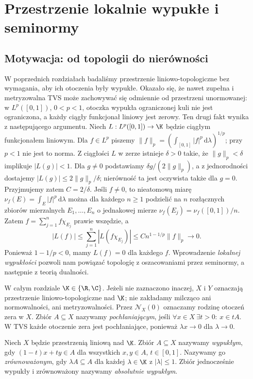 \setcounter{section}{4}
\section{Przestrzenie lokalnie wypukłe i seminormy}\label{sec:lokalnie-wypukle}

\providecommand{\atlasref}[2]{#2}


\subsection{Motywacja: od topologii do nierówności}

W poprzednich rozdziałach badaliśmy przestrzenie liniowo-topologiczne
bez wymagania, aby ich otoczenia były wypukłe. Okazało się, że nawet
zupełna i metryzowalna TVS może zachowywać się odmiennie od przestrzeni
unormowanej: w $L^p([0,1])$, $0<p<1$, otoczka wypukła ograniczonej
kuli nie jest ograniczona, a każdy ciągły funkcjonał liniowy jest zerowy.
Ten drugi fakt wynika z następującego argumentu. Niech
$L:L^p([0,1])\to\K$ będzie ciągłym funkcjonałem liniowym.
Dla $f\in L^p$ piszemy
$\|f\|_p=(\int_{[0,1]}|f|^p\,\mathrm d\lambda)^{1/p}$;
przy $p<1$ nie jest to norma. Z ciągłości $L$ w zerze istnieje $\delta>0$ takie, że
$\|g\|_p<\delta$ implikuje $|L(g)|<1$.
Dla $g\ne0$ podstawiamy $\delta g/(2\|g\|_p)$,
a z jednorodności dostajemy
$|L(g)|\le 2\|g\|_p/\delta$; nierówność ta
jest oczywista także dla $g=0$.
Przyjmujemy zatem $C=2/\delta$.
Jeśli $f\ne0$, to nieatomową miarę
$\nu_f(E)=\int_E|f|^p\,\mathrm d\lambda$ można dla
każdego $n\ge1$ podzielić na $n$ rozłącznych
zbiorów mierzalnych $E_1,\ldots,E_n$ o jednakowej
mierze $\nu_f(E_j)=\nu_f([0,1])/n$. Zatem
$f=\sum_{j=1}^n f\chi_{E_j}$ prawie wszędzie, a
\[
 |L(f)|\le\sum_{j=1}^n|L(f\chi_{E_j})|
 \le C n^{1-1/p}\|f\|_p\longrightarrow0.
\]
Ponieważ $1-1/p<0$, mamy $L(f)=0$ dla każdego $f$.
Wprowadzenie \emph{lokalnej wypukłości} pozwoli nam powiązać topologię
z oszacowaniami przez seminormy, a następnie z teorią dualności.

W całym rozdziale $\K\in\{\R,\C\}$. Jeżeli nie zaznaczono inaczej,
$X$ i $Y$ oznaczają przestrzenie liniowo-topologiczne nad $\K$;
nie zakładamy milcząco ani normowalności, ani metryzowalności.
Przez $\mathcal N_X(0)$ oznaczamy rodzinę otoczeń zera w $X$.
Zbiór $A\subseteq X$ nazywamy \emph{pochłaniającym}, jeśli
$\forall x\in X\ \exists t>0:\ x\in tA$.
W TVS każde otoczenie zera jest pochłaniające, ponieważ
$\lambda x\to0$ dla $\lambda\to0$.

\begin{definicja}
Niech $X$ będzie przestrzenią liniową nad $\K$.
Zbiór $A\subseteq X$ nazywamy \emph{wypukłym}, gdy
$(1-t)x+ty\in A$ dla wszystkich $x,y\in A$, $t\in[0,1]$.
Nazywamy go \emph{zrównoważonym}, gdy $\lambda A\subseteq A$
dla każdej $\lambda\in\K$ z $|\lambda|\le1$.
Zbiór jednocześnie wypukły i zrównoważony nazywamy
\emph{absolutnie wypukłym}.
\end{definicja}

